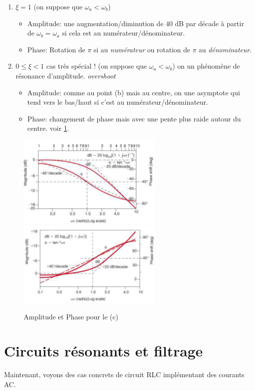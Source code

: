 \documentclass{report}
\begin{document}
\begin{enumerate}
\begin{enumerate}
		\item $\xi = 1$ (on suppose que $\omega_a < \omega_b$)
		\begin{itemize}
			\item Amplitude: une augmentation/diminution de 40 dB par décade à partir de $\omega_b = \omega_a$ si cela est au numérateur/dénominateur.
			\item Phase: Rotation de $\pi$ si au \textit{numérateur} ou rotation de $\pi$ au \textit{dénominateur}.
		\end{itemize}
		\item $0 \leq \xi < 1$ cas très spécial ! (on suppose que $\omega_a < \omega_b$) on un phénomène de résonance d'amplitude. \textit{overshoot}
		\begin{itemize}
			 \item Amplitude: comme au point (b) mais au centre, on une asymptote qui tend vers le bas/haut si c'est au numérateur/dénominateur.
			 \item Phase: changement de phase mais avec une pente plus raide autour du centre. voir \ref{XI}.
		\end{itemize}
	\end{enumerate}
\end{enumerate}

\begin{figure}[H] 
\centering
\includegraphics[width=7cm]{img/AmpXI.png}
\includegraphics[width=7cm]{img/PhaseXI.png}
\caption{Amplitude et Phase pour le (c)}\label{XI}
\end{figure}

\section{Circuits résonants et filtrage}
\noindent
Maintenant, voyons des cas concrets de circuit RLC implémentant des courants AC.
\end{document}
